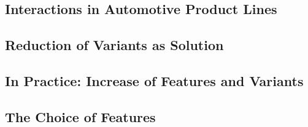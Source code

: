 \subsection{Interactions in Automotive Product Lines}
\subsection{Reduction of Variants as Solution}
\subsection{In Practice: Increase of Features and Variants}
\subsection{The Choice of Features}

%

\lessonslearned{
	\item \ldots
}{
	\item \ldots
}{
	\ldots
}




